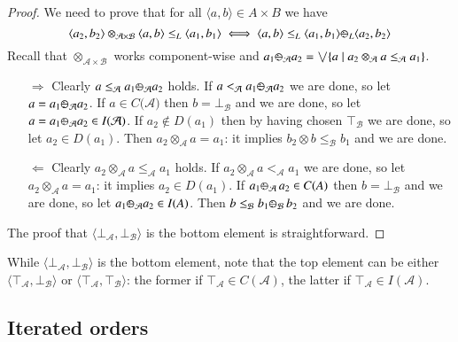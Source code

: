 \documentclass[a4paper]{elsarticle}
\newcommand{\1}{\mathbf{1}}
\def\odiv{{ \ominus\hspace{-8pt}:}\;}
\begin{document}
\begin{proof}
We need to prove that for all $\langle a, b\rangle \in A\times B$ we have
$$\langle a_2, b_2\rangle \otimes_{\mathcal{A} \times \mathcal{B}} \langle a, b\rangle \leq_L \langle a_1, b_1\rangle
\iff \langle a, b\rangle \leq_L  \langle a_1, b_1\rangle \odiv_L \langle a_2, b_2\rangle$$
%
Recall that $\otimes_{\mathcal{A} \times \mathcal{B}}$ works component-wise and 
$a_1 \odiv_\mathcal{A} a_2 = \bigvee \{a \mid a_2 \otimes_\mathcal{A} a \leq_\mathcal{A} a_1\}$.

\begin{itemize}
\item[$\Rightarrow$] Clearly $a \leq_\mathcal{A} a_1 \odiv_\mathcal{A} a_2$ holds.
If $a <_\mathcal{A} a_1 \odiv_\mathcal{A} a_2$ we are done, so let 
$a = a_1 \odiv_\mathcal{A} a_2$. If $a \in C(\mathcal{A)}$ then 
$b = \bot_\mathcal{B}$ and we are done, so let $a = a_1 \odiv_\mathcal{A} a_2 \in I(\mathcal{A)}$.
If $a_2 \not \in D(a_1)$ then by having chosen $\top_\mathcal{B}$ we are done, so let $a_2 \in D(a_1)$.
Then $a_2 \otimes_\mathcal{A} a = a_1$: it implies $b_2 \otimes b \leq_\mathcal{B} b_1$
and we are done.

\item[$\Leftarrow$]
Clearly $a_2 \otimes_\mathcal{A} a \leq_\mathcal{A} a_1$ holds.
If $a_2 \otimes_\mathcal{A} a <_\mathcal{A} a_1$ we are done, so let 
$a_2 \otimes_\mathcal{A} a = a_1$: it implies $a_2 \in D(a_1)$.
If $a_1 \odiv_\mathcal{A} \, a_2 \in C(A)$ then $b = \bot_\mathcal{B}$ and we are done, so let
$a_1 \odiv_\mathcal{A} a_2 \in I(A)$. Then $b\leq_\mathcal{B} b_1 \odiv_\mathcal{B} \, b_2$
and we are done.
\end{itemize}

The proof that $\langle \bot_\mathcal{A}, \bot_\mathcal{B} \rangle$ is the bottom element is straightforward.
\end{proof}

While $\langle \bot_\mathcal{A}, \bot_\mathcal{B} \rangle$ is the bottom element, note that the top element can be 
either $\langle \top_\mathcal{A}, \bot_\mathcal{B} \rangle$ or $\langle \top_\mathcal{A}, \top_\mathcal{B} \rangle$:
the former if $\top_\mathcal{A} \in C(\mathcal{A})$, the latter if $\top_\mathcal{A} \in I(\mathcal{A})$.

\subsection{Iterated orders}
\end{document}
